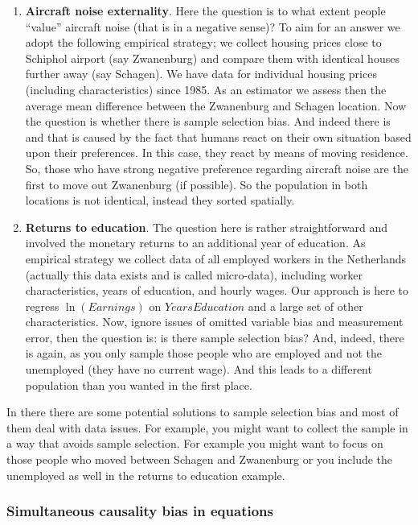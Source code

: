 \documentclass[
]{book}
\begin{document}
\begin{enumerate}
\def\labelenumi{\arabic{enumi}.}
\item
  \textbf{Aircraft noise externality}. Here the question is to what extent people ``value'' aircraft noise (that is in a negative sense)? To aim for an answer we adopt the following empirical strategy; we collect housing prices close to Schiphol airport (say Zwanenburg) and compare them with identical houses further away (say Schagen). We have data for individual housing prices (including characteristics) since 1985. As an estimator we assess then the average mean difference between the Zwanenburg and Schagen location. Now the question is whether there is sample selection bias. And indeed there is and that is caused by the fact that humans react on their own situation based upon their preferences. In this case, they react by means of moving residence. So, those who have strong negative preference regarding aircraft noise are the first to move out Zwanenburg (if possible). So the population in both locations is not identical, instead they sorted spatially.
\item
  \textbf{Returns to education}. The question here is rather straightforward and involved the monetary returns to an additional year of education. As empirical strategy we collect data of all employed workers in the Netherlands (actually this data exists and is called micro-data), including worker characteristics, years of education, and hourly wages. Our approach is here to regress \(\ln(Earnings)\) on \(YearsEducation\) and a large set of other characteristics. Now, ignore issues of omitted variable bias and measurement error, then the question is: is there sample selection bias? And, indeed, there is again, as you only sample those people who are employed and not the unemployed (they have no current wage). And this leads to a different population than you wanted in the first place.
\end{enumerate}

In there there are some potential solutions to sample selection bias and most of them deal with data issues. For example, you might want to collect the sample in a way that avoids sample selection. For example you might want to focus on those people who moved between Schagen and Zwanenburg or you include the unemployed as well in the returns to education example.

\hypertarget{simultaneous-causality-bias-in-equations}{%
\subsubsection{Simultaneous causality bias in equations}\label{simultaneous-causality-bias-in-equations}}
\end{document}
